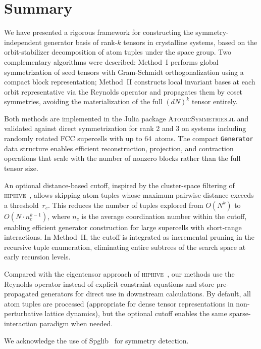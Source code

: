 \documentclass[twocolumn,amsmath,amssymb,aps,prb,10pt,floatfix]{revtex4-2}
\begin{document}
\section{Summary}
\label{sec:summary}

We have presented a rigorous framework for constructing the symmetry-independent generator basis of rank-$k$ tensors in crystalline systems, based on the orbit-stabilizer decomposition of atom tuples under the space group.
Two complementary algorithms were described:
Method~I performs global symmetrization of seed tensors with Gram-Schmidt orthogonalization using a compact block representation;
Method~II constructs local invariant bases at each orbit representative via the Reynolds operator and propagates them by coset symmetries, avoiding the materialization of the full $(dN)^k$ tensor entirely.

Both methods are implemented in the Julia package \textsc{AtomicSymmetries.jl} and validated against direct symmetrization for rank 2 and 3 on systems including randomly rotated FCC supercells with up to 64~atoms.
The compact \texttt{Generator} data structure enables efficient reconstruction, projection, and contraction operations that scale with the number of nonzero blocks rather than the full tensor size.

An optional distance-based cutoff, inspired by the cluster-space filtering of \textsc{hiphive}~\cite{Eriksson2019,Fransson2020}, allows skipping atom tuples whose maximum pairwise distance exceeds a threshold~$r_c$.
This reduces the number of tuples explored from $O(N^k)$ to $O(N \cdot n_c^{k-1})$, where $n_c$ is the average coordination number within the cutoff, enabling efficient generator construction for large supercells with short-range interactions.
In Method~II, the cutoff is integrated as incremental pruning in the recursive tuple enumeration, eliminating entire subtrees of the search space at early recursion levels.

Compared with the eigentensor approach of \textsc{hiphive}~\cite{Eriksson2019}, our methods use the Reynolds operator instead of explicit constraint equations and store pre-propagated generators for direct use in downstream calculations.
By default, all atom tuples are processed (appropriate for dense tensor representations in non-perturbative lattice dynamics), but the optional cutoff enables the same sparse-interaction paradigm when needed.

\begin{acknowledgments}
We acknowledge the use of Spglib~\cite{Togo2024spglib} for symmetry detection.
\end{acknowledgments}


\end{document}
